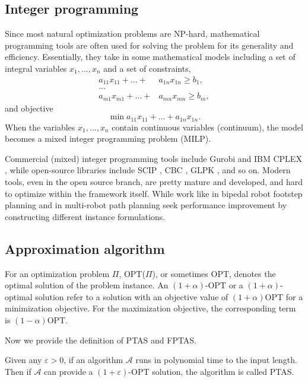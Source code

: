 \subsection{Integer programming}
Since most natural optimization problems are NP-hard, mathematical programming tools are often 
used for solving the problem for its generality and efficiency. Essentially, they take in
some mathematical models including a set of integral variables $x_1, \dots, x_n$ and a set of constraints,
\begin{align*}
    a_{11} x_{11} + \dots + & a_{1n} x_{1n} \geq b_1,\\
    \dots & \\
    a_{m1} x_{m1} + \dots + & a_{mn} x_{mn} \geq b_m,
\end{align*}
and objective 
\[
    \min a_{11} x_{11} + \dots + a_{1n} x_{1n}.
\]
When the variables $x_1, \dots, x_n$ contain continuous variables (continuum), the model becomes a mixed integer programming problem (MILP).

Commercial (mixed) integer programming tools include Gurobi \cite{optimization2019gurobi} and IBM CPLEX \cite{cplex2009v12}, while open-source 
libraries include SCIP \cite{achterberg2009scip}, CBC \cite{forrest2005cbc}, GLPK \cite{makhorin2008glpk}, and so on. 
Modern tools, even in the open source branch, are pretty mature and developed, and hard to optimize within the framework itself. 
While work like \cite{deits2014footstep} in bipedal robot footstep planning and \cite{guo2021spatial} in multi-robot path planning 
seek performance improvement by constructing different instance formulations.

\subsection{Approximation algorithm}
For an optimization problem $\Pi$, OPT($\Pi$), or sometimes OPT, 
denotes the optimal solution of the problem instance. An $(1+\alpha)$-OPT or a $(1+\alpha)$-optimal solution refer
to a solution with an objective value of $(1+\alpha)$OPT for a minimization objective. For the maximization objective,
the corresponding term is $(1-\alpha)$OPT.

Now we provide the definition of PTAS and FPTAS.
\begin{definition}
    Given any $\varepsilon>0$, if an algorithm $\mathcal A$ runs in polynomial time to the input length. 
    Then if $\mathcal A$ can provide a $(1+\varepsilon)$-OPT solution, the algorithm is called PTAS.
\end{definition}

